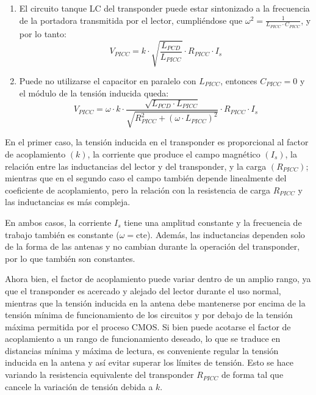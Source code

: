 \begin{enumerate}
	\item El circuito tanque LC del transponder puede estar sintonizado a la 
	frecuencia de la portadora transmitida por el lector, cumpliéndose que \(
	\omega^2=\frac{1}{L_{PICC} \cdot C_{PICC}}\), y por lo tanto:
	\begin{equation}
		\label{eq:VpiccRLC}
		V_{PICC} = k \cdot \sqrt{\frac{L_{PCD}}{L_{PICC}}} \cdot R_{PICC} \cdot I_s
	\end{equation}
	
	\item Puede no utilizarse el capacitor en paralelo con \(L_{PICC}\), 
	entonces \(C_{PICC}=0\) y el módulo de la tensión inducida queda:
	\begin{equation}
		\label{eq:VpiccRL}
		V_{PICC} = \omega \cdot k \cdot \frac{\sqrt{L_{PCD} \cdot L_{PICC}}}{\sqrt{R_{PICC}^2 + \left( \omega \cdot L_{PICC} \right)^2}} \cdot R_{PICC} \cdot I_s
	\end{equation}
\end{enumerate}

En el primer caso, la tensión inducida en el transponder es proporcional al 
factor de acoplamiento \((k)\), la corriente que produce el campo magnético 
\((I_s)\), la relación entre las inductancias del lector y del transponder, 
y la carga \((R_{PICC})\); mientras que en el segundo caso el campo también 
depende linealmente del coeficiente de acoplamiento, pero la relación con la 
resistencia de carga \(R_{PICC}\) y las inductancias es más compleja. 

En ambos casos, la corriente \(I_s\) tiene una amplitud constante y la 
frecuencia de trabajo también es constante (\(\omega=\mathrm{cte}\)). 
Además, las inductancias dependen solo de la forma de las antenas y no 
cambian durante la operación del transponder, por lo que también son 
constantes.

Ahora bien, el factor de acoplamiento puede variar dentro de un amplio 
rango, ya que el transponder es acercado y alejado del lector durante el uso 
normal, mientras que la tensión inducida en la antena debe mantenerse por 
encima de la tensión mínima de funcionamiento de los circuitos y por debajo 
de la tensión máxima permitida por el proceso CMOS. Si bien puede acotarse 
el factor de acoplamiento a un rango de funcionamiento deseado, lo que se 
traduce en distancias mínima y máxima de lectura, es conveniente regular la 
tensión inducida en la antena y así evitar superar los límites de tensión. 
Esto se hace variando la resistencia equivalente del transponder \(R_{PICC}\)
de forma tal que cancele la variación de tensión debida a \(k\).

